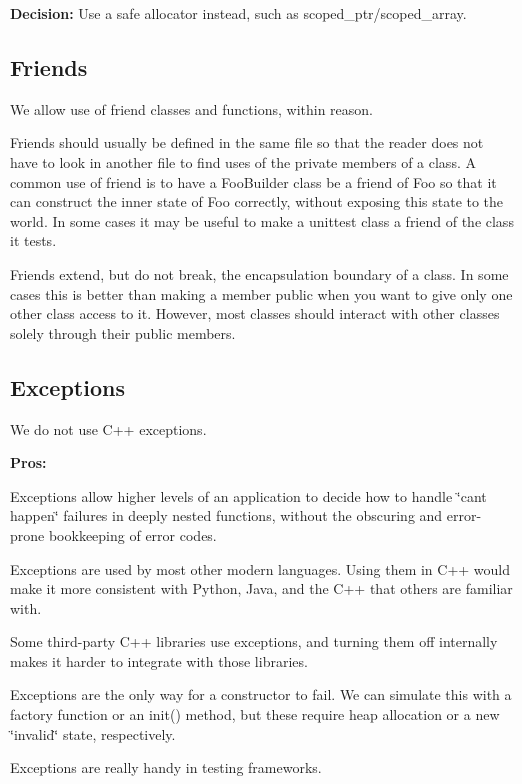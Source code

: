 {\bfseries Decision\+:} Use a safe allocator instead, such as scoped\+\_\+ptr/scoped\+\_\+array.

\subsection*{Friends}

We allow use of friend classes and functions, within reason.

Friends should usually be defined in the same file so that the reader does not have to look in another file to find uses of the private members of a class. A common use of friend is to have a Foo\+Builder class be a friend of Foo so that it can construct the inner state of Foo correctly, without exposing this state to the world. In some cases it may be useful to make a unittest class a friend of the class it tests.

Friends extend, but do not break, the encapsulation boundary of a class. In some cases this is better than making a member public when you want to give only one other class access to it. However, most classes should interact with other classes solely through their public members.

\subsection*{Exceptions}

We do not use C++ exceptions.

{\bfseries Pros\+:}


\begin{DoxyItemize}
\item Exceptions allow higher levels of an application to decide how to handle \char`\"{}can\textquotesingle{}t happen\char`\"{} failures in deeply nested functions, without the obscuring and error-\/prone bookkeeping of error codes.
\item Exceptions are used by most other modern languages. Using them in C++ would make it more consistent with Python, Java, and the C++ that others are familiar with.
\item Some third-\/party C++ libraries use exceptions, and turning them off internally makes it harder to integrate with those libraries.
\item Exceptions are the only way for a constructor to fail. We can simulate this with a factory function or an {\ttfamily init()} method, but these require heap allocation or a new \char`\"{}invalid\char`\"{} state, respectively.
\item Exceptions are really handy in testing frameworks.
\end{DoxyItemize}

